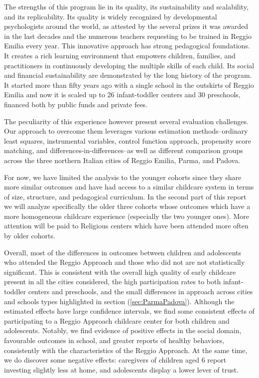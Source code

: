 \documentclass[12pt]{article}
\begin{document}
The strengths of this program lie in its quality, its sustainability and scalability, and its replicability. Its quality is widely recognized by developmental psychologists around the world, as attested by the several prizes it was awarded in the last decades and the numerous teachers requesting to be trained in Reggio Emilia every year. This innovative approach has strong pedagogical foundations. It creates a rich learning environment that empowers children, families, and practitioners in continuously developing the multiple skills of each child. Its social and financial sustainability are demonstrated by the long history of the program. It started more than fifty years ago with a single school in the outskirts of Reggio Emilia and now it is scaled up to 26 infant-toddler centers and 30 preschools, financed both by public funds and private fees.

The peculiarity of this experience however present several evaluation challenges. Our approach to overcome them leverages various estimation methods--ordinary least squares, instrumental variables, control function approach, propensity score matching, and differences-in-differences--as well as different comparison groups across the three northern Italian cities of Reggio Emilia, Parma, and Padova.

For now, we have limited the analysis to the younger cohorts since they share more similar outcomes and have had access to a similar childcare system in terms of size, structure, and pedagogical curriculum. In the second part of this report we will analyze specifically the older three cohorts whose outcomes which have a more homogeneous childcare experience (especially the two younger ones). More attention will be paid to Religious centers which have been attended more often by older cohorts.

Overall, most of the differences in outcomes between children and adolescents who attended the Reggio Approach and those who did not are not statistically significant. This is consistent with the overall high quality of early childcare present in all the cities considered, the high participation rates to both infant-toddler centers and preschools, and the small differences in approach across cities and schools types highlighted in section (\ref{sec:ParmaPadova}). 
Although the estimated effects have large confidence intervals, we find some consistent effects of participating to a Reggio Approach childcare center for both children and adolescents. Notably, we find evidence of positive effects in the social domain, favourable outcomes in school, and greater reports of healthy behaviors, consistently with the characteristics of the Reggio Approach. At the same time, we do discover some negative effects: caregivers of children aged 6 report investing slightly less at home, and adolescents display a lower lever of trust.

\pagebreak


\end{document}

